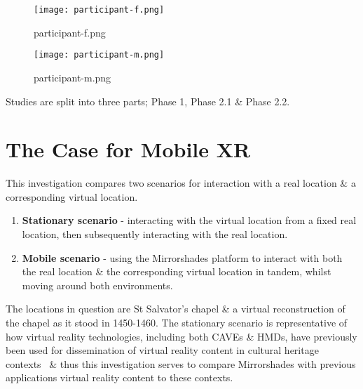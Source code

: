 
\begin{figure}[h]
	\begin{center}
		\texttt{[image: participant-f.png]}
		\caption{participant-f.png}
		\label{participant-f.png}
	\end{center}
\end{figure}

\begin{figure}[h]
	\begin{center}
		\texttt{[image: participant-m.png]}
		\caption{participant-m.png}
		\label{participant-m.png}
	\end{center}
\end{figure}

Studies are split into three parts; Phase 1, Phase 2.1 \& Phase 2.2.

\section{The Case for Mobile XR}
This investigation compares two scenarios for interaction with a real location \& a corresponding virtual location.

\begin{enumerate}
	\item \textbf{Stationary scenario} - interacting with the virtual location from a fixed real location, then subsequently interacting with the real location.
	\item \textbf{Mobile scenario} - using the Mirrorshades platform to interact with both the real location \& the corresponding virtual location in tandem, whilst moving around both environments.
\end{enumerate}

The locations in question are St Salvator's chapel \& a virtual reconstruction of the chapel as it stood in 1450-1460. The stationary scenario is representative of how virtual reality technologies, including both CAVEs \& HMDs, have previously been used for dissemination of virtual reality content in cultural heritage contexts~\cite{Roussou2002} \& thus this investigation serves to compare Mirrorshades with previous applications virtual reality content to these contexts.

